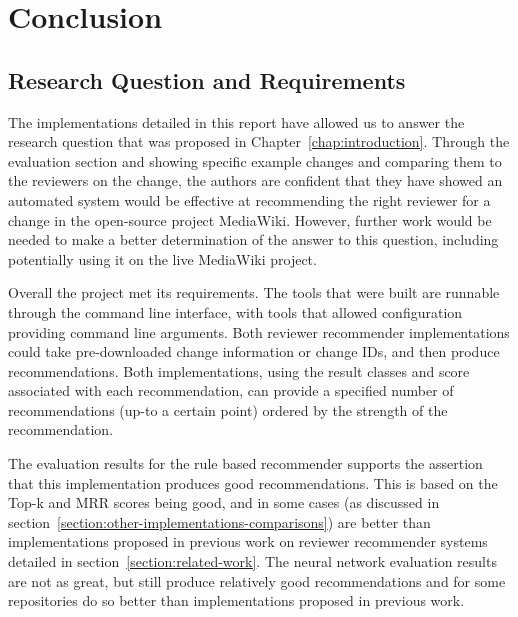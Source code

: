 \chapter{Conclusion\label{chap:conclusion}}


\section{Research Question and Requirements}

The implementations detailed in this report have allowed us to answer the research question that was proposed in Chapter~\ref{chap:introduction}.  Through the evaluation section and showing specific example changes and comparing them to the reviewers on the change, the authors are confident that they have showed an automated system would be effective at recommending the right reviewer for a change in the open-source project MediaWiki. However, further work would be needed to make a better determination of the answer to this question, including potentially using it on the live MediaWiki project.

Overall the project met its requirements. The tools that were built are runnable through the command line interface, with tools that allowed configuration providing command line arguments. Both reviewer recommender implementations could take pre-downloaded change information or change IDs, and then produce recommendations. Both implementations, using the result classes and score associated with each recommendation, can provide a specified number of recommendations (up-to a certain point) ordered by the strength of the recommendation.

The evaluation results for the rule based recommender supports the assertion that this implementation produces good recommendations. This is based on the Top-k and MRR scores being good, and in some cases (as discussed in section~\ref{section:other-implementations-comparisons}) are better than implementations proposed in previous work on reviewer recommender systems detailed in section~\ref{section:related-work}. The neural network evaluation results are not as great, but still produce relatively good recommendations and for some repositories do so better than implementations proposed in previous work.

